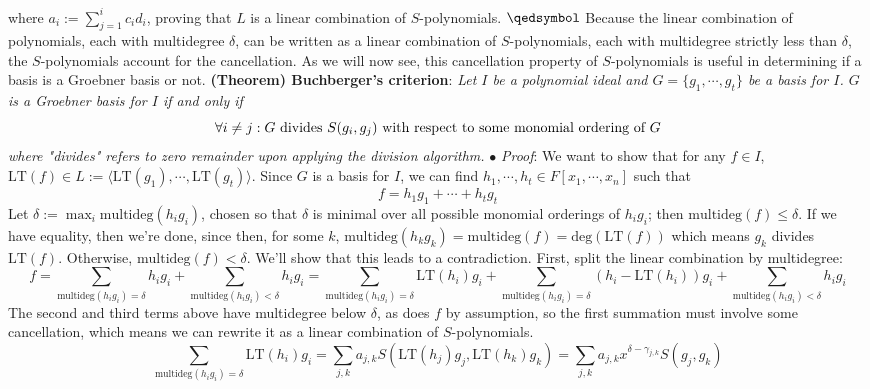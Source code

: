 \documentclass{article}
\begin{document}
where $ a_i := \sum_{j = 1}^i c_i d_i $, proving that $ L $ is a linear combination of $ S $-polynomials. $ \qedsymbol $
\newline \newline
Because the linear combination of polynomials, each with multidegree $ \delta $, can be written as a linear combination of $ S $-polynomials, each with multidegree strictly less than $ \delta $, the $ S $-polynomials account for the cancellation. As we will now see, this cancellation property of $ S $-polynomials is useful in determining if a basis is a Groebner basis or not.
\newline \newline
\textbf{(Theorem) Buchberger's criterion}: \textit{Let $ I $ be a polynomial ideal and $ G = \{ g_1, \cdots, g_t \} $ be a basis for $ I $. $ G $ is a Groebner basis for $ I $ if and only if}
$$ \forall i \neq j: G \text{ divides } S(g_i, g_j) \text{ with respect to some monomial ordering of $ G $} $$
\indent \textit{where "divides" refers to zero remainder upon applying the division algorithm.}
\newline
\indent $ \bullet $ \textit{Proof}: We want to show that for any $ f \in I $, $ \text{LT}(f) \in L := \langle \text{LT}(g_1), \cdots, \text{LT}(g_t) \rangle $. Since $ G $ is a basis for $ I $, we can find $ h_1, \cdots, h_t \in F[x_1, \cdots, x_n] $ such that
$$ f = h_1 g_1 + \cdots + h_t g_t $$
Let $ \delta := \max_i \text{multideg}(h_i g_i) $, chosen so that $ \delta $ is minimal over all possible monomial orderings of $ h_i g_i $; then $ \text{multideg}(f) \leq \delta $. If we have equality, then we're done, since then, for some $ k $, $ \text{multideg}(h_k g_k) = \text{multideg}(f) = \text{deg}(\text{LT}(f)) $ which means $ g_k $ divides $ \text{LT}(f) $.
\newline
Otherwise, $ \text{multideg}(f) < \delta $. We'll show that this leads to a contradiction. First, split the linear combination by multidegree:
$$ f = \sum_{\text{multideg}(h_i g_i) = \delta} h_i g_i + \sum_{\text{multideg}(h_i g_i) < \delta} h_i g_i = \sum_{\text{multideg}(h_i g_i) = \delta} \text{LT}(h_i) g_i + \sum_{\text{multideg}(h_i g_i) = \delta} (h_i - \text{LT}(h_i)) g_i + \sum_{\text{multideg}(h_i g_i) < \delta} h_i g_i $$
The second and third terms above have multidegree below $ \delta $, as does $ f $ by assumption, so the first summation must involve some cancellation, which means we can rewrite it as a linear combination of $ S $-polynomials.
$$ \sum_{\text{multideg}(h_i g_i) = \delta} \text{LT}(h_i) g_i = \sum_{j, k} a_{j, k} S(\text{LT}(h_j) g_j, \text{LT}(h_k) g_k) = \sum_{j, k} a_{j, k} x^{\delta - \gamma_{j, k}} S(g_j, g_k) $$
\end{document}
